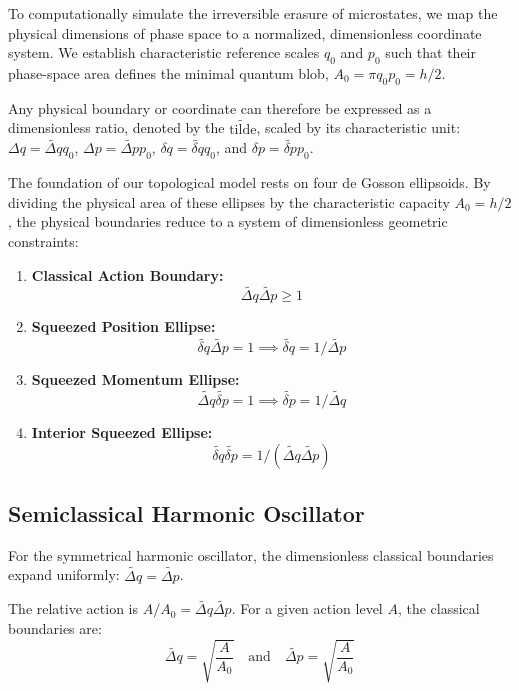 \documentclass[%
  aps, reprint, prl, amsmath,amssymb
]{revtex4-2}
\begin{document}
To computationally simulate the irreversible erasure of microstates, we map the physical dimensions of phase space to a normalized, dimensionless coordinate system. We establish characteristic reference scales $q_0$ and $p_0$ such that their phase-space area defines the minimal quantum blob, $A_0 = \pi q_0 p_0 = h/2$.

Any physical boundary or coordinate can therefore be expressed as a dimensionless ratio, denoted by the $\widetilde{\text{tilde}}$, scaled by its characteristic unit: $\Delta q = \widetilde{\Delta q} q_0$, $\Delta p = \widetilde{\Delta p} p_0$, $\delta q = \widetilde{\delta q} q_0$, and $\delta p = \widetilde{\delta p} p_0$.

The foundation of our topological model rests on four de Gosson ellipsoids. By dividing the physical area of these ellipses by the characteristic capacity $A_0 = h/2$, the physical boundaries reduce to a system of dimensionless geometric constraints:
\begin{enumerate}
    \item \textbf{Classical Action Boundary:} $$\widetilde{\Delta q} \widetilde{\Delta p} \ge 1$$    
    \item \textbf{Squeezed Position Ellipse:} $$\widetilde{\delta q} \widetilde{\Delta p} = 1 \implies \widetilde{\delta q} = 1 / \widetilde{\Delta p}$$
    \item \textbf{Squeezed Momentum Ellipse:} $$\widetilde{\Delta q} \widetilde{\delta p} = 1 \implies \widetilde{\delta p} = 1 / \widetilde{\Delta q}$$
    \item \textbf{Interior Squeezed Ellipse:} $$\widetilde{\delta q} \widetilde{\delta p} = 1 / (\widetilde{\Delta q} \widetilde{\Delta p})$$
\end{enumerate}

\subsection{Semiclassical Harmonic Oscillator}

For the symmetrical harmonic oscillator, the dimensionless classical boundaries expand uniformly: $\widetilde{\Delta q} = \widetilde{\Delta p}$.

The relative action is $A/A_0 = \widetilde{\Delta q} \widetilde{\Delta p}$. For a given action level $A$, the classical boundaries are:
\begin{equation}
\widetilde{\Delta q} = \sqrt{\frac{A}{A_0}} \quad \text{and} \quad \widetilde{\Delta p} = \sqrt{\frac{A}{A_0}}
\end{equation}
\end{document}
